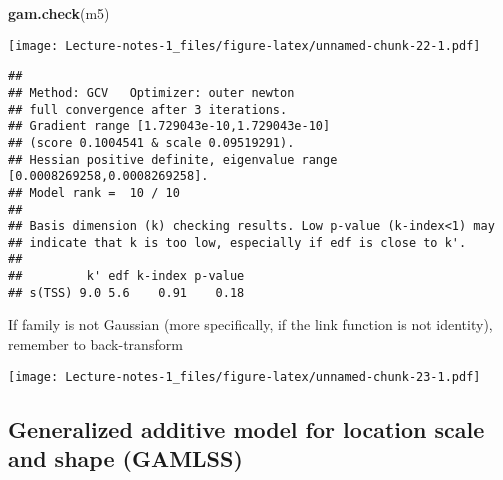 \documentclass[
]{book}
\newenvironment{Shaded}{\begin{snugshade}}{\end{snugshade}}
\newcommand{\DataTypeTok}[1]{\textcolor[rgb]{0.13,0.29,0.53}{#1}}
\newcommand{\DecValTok}[1]{\textcolor[rgb]{0.00,0.00,0.81}{#1}}
\newcommand{\KeywordTok}[1]{\textcolor[rgb]{0.13,0.29,0.53}{\textbf{#1}}}
\newcommand{\NormalTok}[1]{#1}
\newcommand{\OperatorTok}[1]{\textcolor[rgb]{0.81,0.36,0.00}{\textbf{#1}}}
\newcommand{\OtherTok}[1]{\textcolor[rgb]{0.56,0.35,0.01}{#1}}
\newcommand{\StringTok}[1]{\textcolor[rgb]{0.31,0.60,0.02}{#1}}
\begin{document}
\begin{Shaded}
\begin{Highlighting}[]
\KeywordTok{gam.check}\NormalTok{(m5)}
\end{Highlighting}
\end{Shaded}

\texttt{[image: Lecture-notes-1\_files/figure-latex/unnamed-chunk-22-1.pdf]}

\begin{verbatim}
## 
## Method: GCV   Optimizer: outer newton
## full convergence after 3 iterations.
## Gradient range [1.729043e-10,1.729043e-10]
## (score 0.1004541 & scale 0.09519291).
## Hessian positive definite, eigenvalue range [0.0008269258,0.0008269258].
## Model rank =  10 / 10 
## 
## Basis dimension (k) checking results. Low p-value (k-index<1) may
## indicate that k is too low, especially if edf is close to k'.
## 
##         k' edf k-index p-value
## s(TSS) 9.0 5.6    0.91    0.18
\end{verbatim}

If family is not Gaussian (more specifically, if the link function is not identity), remember to back-transform

\begin{Shaded}
\end{Shaded}

\texttt{[image: Lecture-notes-1\_files/figure-latex/unnamed-chunk-23-1.pdf]}

\hypertarget{generalized-additive-model-for-location-scale-and-shape-gamlss-1}{%
\subsection{Generalized additive model for location scale and shape (GAMLSS)}\label{generalized-additive-model-for-location-scale-and-shape-gamlss-1}}
\end{document}
